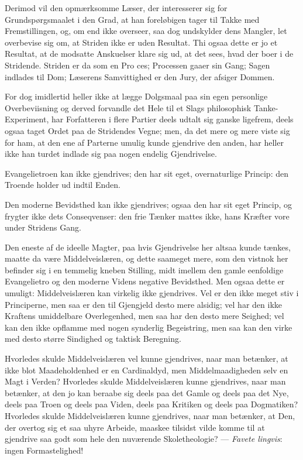 \documentclass[12pt,a4paper]{book}
\begin{document}
Derimod vil den opmærksomme Læser, der interesserer sig for
Grundspørgsmaalet i den Grad, at han foreløbigen tager til Takke med
Fremstillingen, og, om end ikke overseer, saa dog undskylder dens Mangler,
let overbevise sig om, at Striden ikke er uden Resultat. Thi ogsaa dette er
jo et Resultat, at de modsatte Anskuelser klare sig ud, at det sees, hvad der
boer i de Stridende. Striden er da som en Pro\-%
ces; Processen gaaer sin Gang; Sagen indlades til Dom; Læserens
Samvittighed er den Jury, der afsiger Dommen.

For dog imidlertid heller ikke at lægge Dolgsmaal paa sin egen personlige
Overbeviisning og derved forvandle det Hele til et Slags philosophisk
Tanke-Experiment, har Forfatteren i flere Partier deels udtalt sig ganske
ligefrem, deels ogsaa taget Ordet paa de Stridendes Vegne; men, da det mere
og mere viste sig for ham, at den ene af Parterne umulig kunde gjendrive den
anden, har heller ikke han turdet indlade sig paa nogen endelig Gjendrivelse.

Evangelietroen kan ikke gjendrives; den har sit eget, overnaturlige Princip:
den Troende holder ud indtil Enden.

Den moderne Bevidsthed kan ikke gjendrives; ogsaa den har sit eget Princip,
og frygter ikke dets Conseqvenser: den frie Tænker mattes ikke, hans Kræfter
vore under Stridens Gang.

Den eneste af de ideelle Magter, paa hvis Gjendrivelse her altsaa kunde
tænkes, maatte da være Middelveislæren, og dette saameget mere, som den
vistnok her befinder sig i en temmelig kneben Stilling, midt imellem den
gamle eenfoldige Evangelietro og den
moderne Videns negative Bevidsthed. Men ogsaa dette er umuligt:
Middelveislæren kan virkelig ikke gjendrives. Vel er den ikke meget stiv i
Principerne, men saa er den til Gjengjeld desto mere alsidig; vel har den
ikke Kraftens umiddelbare Overlegenhed, men saa har den desto mere Seighed;
vel kan den ikke opflamme med nogen synderlig Begeistring, men saa kan den
virke med desto større Sindighed og taktisk Beregning.

Hvorledes skulde Middelveislæren vel kunne gjendrives, naar man betænker, at
ikke blot Maadeholdenhed er en Cardinaldyd, men Middelmaadigheden selv en
Magt i Verden? Hvorledes skulde Middelveislæren kunne gjendrives, naar man
betænker, at den jo kan beraabe sig deels paa det Gamle og deels paa det Nye,
deels paa Troen og deels paa Viden, deels paa Kritiken og deels paa
Dogmatiken? Hvorledes skulde Middelveislæren kunne gjendrives, naar man
betænker, at Den, der overtog sig et saa uhyre Arbeide, maaskee tilsidst
vilde komme til at gjendrive saa godt som hele den nuværende Skoletheologie?
--- \textit{Favete lingvis}: ingen Formastelighed!
\end{document}
